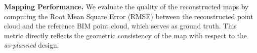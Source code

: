 
\textbf{Mapping Performance.}  
We evaluate the quality of the reconstructed maps by computing the Root Mean Square Error (RMSE) between the reconstructed point cloud and the reference BIM point cloud, which serves as ground truth.  
This metric directly reflects the geometric consistency of the map with respect to the \textit{as-planned} design.  
